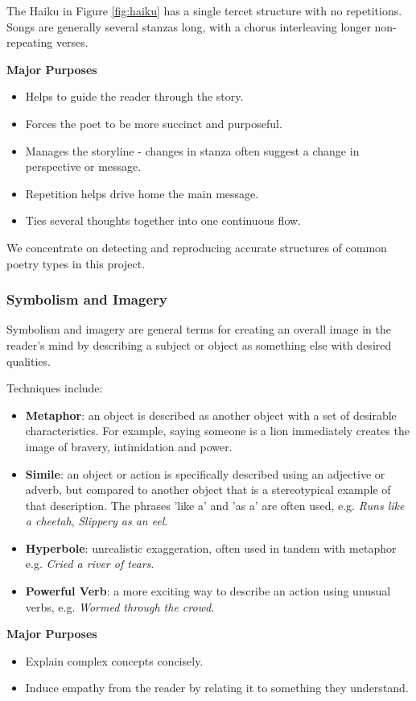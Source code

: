 The Haiku in Figure \ref{fig:haiku} has a single tercet structure with no repetitions. Songs are generally several stanzas long, with a chorus interleaving longer non-repeating verses.

\textbf{Major Purposes}
\begin{itemize}
\item{Helps to guide the reader through the story.}
\item{Forces the poet to be more succinct and purposeful.}
\item{Manages the storyline - changes in stanza often suggest a change in perspective or message.}
\item{Repetition helps drive home the main message.}
\item{Ties several thoughts together into one continuous flow.}
\end{itemize} 

We concentrate on detecting and reproducing accurate structures of common poetry types in this project.

\subsubsection{Symbolism and Imagery}
\label{sec:symbol}
Symbolism and imagery are general terms for creating an overall image in the reader's mind by describing a subject or object as something else with desired qualities.

Techniques include:
\begin{itemize}
\item{\textbf{Metaphor}: an object is described as another object with a set of desirable characteristics. For example, saying someone is a lion immediately creates the image of bravery, intimidation and power.}
\item{\textbf{Simile}: an object or action is specifically described using an adjective or adverb, but compared to another object that is a stereotypical example of that description. The phrases 'like a' and 'as a' are often used, e.g. \textit{Runs like a cheetah}, \textit{Slippery as an eel}.}
\item{\textbf{Hyperbole}: unrealistic exaggeration, often used in tandem with metaphor e.g. \textit{Cried a river of tears}.}
\item{\textbf{Powerful Verb}: a more exciting way to describe an action using unusual verbs, e.g. \textit{Wormed through the crowd}.}
\end{itemize}

\textbf{Major Purposes}
\begin{itemize}
\item{Explain complex concepts concisely.}
\item{Induce empathy from the reader by relating it to something they understand.}
\end{itemize} 

